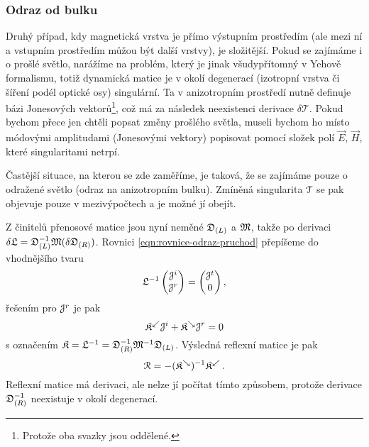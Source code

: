 \subsubsection*{Odraz od bulku}

Druhý případ, kdy magnetická vrstva je přímo výstupním prostředím (ale mezi ní a vstupním prostředím můžou být další vrstvy), je složitější.
Pokud se zajímáme i o prošlé světlo, narážíme na problém, který je jinak všudypřítomný v Yehově formalismu, totiž dynamická matice je v okolí degenerací (izotropní vrstva či šíření podél optické osy) singulární.
Ta v anizotropním prostředí nutně definuje bázi Jonesových vektorů\footnote{Protože oba svazky jsou oddělené.}, což má za následek neexistenci derivace $\delta\mathcal{T}$.
Pokud bychom přece jen chtěli popsat změny prošlého světla, museli bychom ho místo módovými amplitudami (Jonesovými vektory) popisovat pomocí složek polí $\vec{E}$, $\vec{H}$, které singularitami netrpí.

Častější situace, na kterou se zde zaměříme, je taková, že se zajímáme pouze o odražené světlo (odraz na anizotropním bulku).
Zmíněná singularita $\mathcal{T}$ se pak objevuje pouze v mezivýpočtech a je možné jí obejít.

Z činitelů přenosové matice jsou nyní neměné $\mathfrak{D}_{(L)}$ a $\mathfrak{M}$, takže po derivaci $\delta\mathfrak{L}=\mathfrak{D}_{(L)}^{-1}\mathfrak{M}(\delta\mathfrak{D}_{(R)})$.
Rovnici \eqref{eqn:rovnice-odraz-pruchod} přepíšeme do vhodnějšího tvaru
\begin{equation}
    \mathfrak{L}^{-1} \begin{pmatrix} \mathcal{J}^i \\ \mathcal{J}^r \end{pmatrix}
    = \begin{pmatrix} \mathcal{J}^t \\ 0 \end{pmatrix} ,
\end{equation}
řešením pro $\mathcal{J}^r$ je pak
\begin{equation}
    \label{eqn:app-projekce}
    \mathfrak{K}^\swarrow \mathcal{J}^i + \mathfrak{K}^\searrow \mathcal{J}^r = 0
\end{equation}
s označením $\mathfrak{K}=\mathfrak{L}^{-1} = \mathfrak{D}_{(R)}^{-1}\mathfrak{M}^{-1}\mathfrak{D}_{(L)}$.
Výsledná reflexní matice je pak 
\begin{equation}
    \label{eqn:app-refl-bulk}
\mathcal{R}=-(\mathfrak{K}^\searrow)^{-1}\mathfrak{K}^\swarrow \,.
\end{equation}
Reflexní matice má derivaci, ale nelze jí počítat tímto způsobem, protože derivace $\mathfrak{D}_{(R)}^{-1}$ neexistuje v okolí degenerací.

